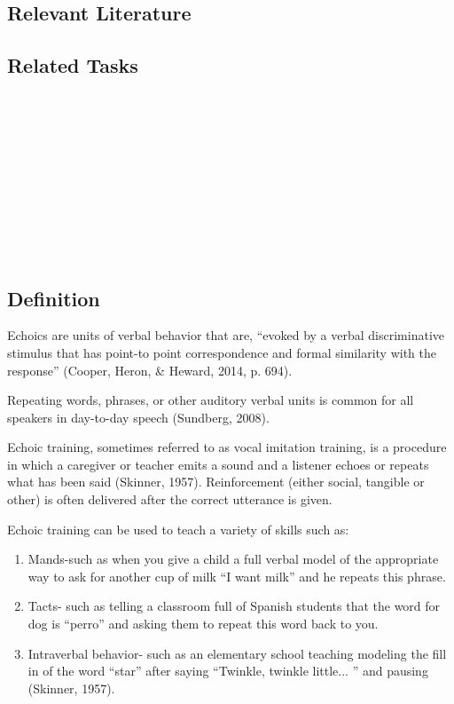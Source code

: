 \subsection{Relevant Literature}
\begin{refsection}
\nocite{cooper2007applied,
    partington1998assessment,
    semel2003clinical,
    skinner1957verbal,
    sundberg2008verbal,
    sundberg1998teaching}
\printbibliography[heading=none]
\end{refsection}
%
\subsection{Related Tasks}
\fourdTen{}\\
\fourdEleven{}\\
\fourdTwelve{}\\
\fourdThirteen{}\\
\fourdFourteen{}\\
\fourFKFourtyThree{}\\
\fourFKFourtyFour{}\\
\fourFKFourtyFive{}\\
\fourFKFourtySix{}\\
%
%
%
%
\section{\fourdTen{}}
\subsection{Definition} 
Echoics are units of verbal behavior that are, ``evoked by a verbal discriminative stimulus that has point-to point correspondence and formal similarity with the response'' (Cooper, Heron, \& Heward, 2014, p. 694).  

Repeating words, phrases, or other auditory verbal units is common for all speakers in day-to-day speech (Sundberg, 2008).

Echoic training, sometimes referred to as vocal imitation training, is a procedure in which a caregiver or teacher emits a sound and a listener echoes or repeats what has been said (Skinner, 1957).  Reinforcement (either social, tangible or other) is often delivered after the correct utterance is given.  

Echoic training can be used to teach a variety of skills such as:
\begin{enumerate}
\item Mands-such as when you give a child a full verbal model of the appropriate way to ask for another cup of milk ``I want milk'' and he repeats this phrase.
\item Tacts- such as telling a classroom full of Spanish students that the word for dog is ``perro'' and asking them to repeat this word back to you.
\item Intraverbal behavior- such as an elementary school teaching modeling the fill in of the word ``star'' after saying ``Twinkle, twinkle little... '' and pausing (Skinner, 1957).
\end{enumerate}


